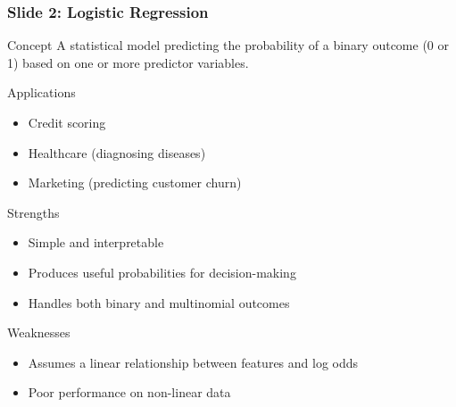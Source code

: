 \documentclass[aspectratio=169]{beamer}
\begin{document}
\begin{frame}[fragile]
    \frametitle{Slide 2: Logistic Regression}
    \begin{block}{Concept}
        A statistical model predicting the probability of a binary outcome (0 or 1) based on one or more predictor variables.
    \end{block}
    \begin{block}{Applications}
        \begin{itemize}
            \item Credit scoring
            \item Healthcare (diagnosing diseases)
            \item Marketing (predicting customer churn)
        \end{itemize}
    \end{block}
    \begin{block}{Strengths}
        \begin{itemize}
            \item Simple and interpretable
            \item Produces useful probabilities for decision-making
            \item Handles both binary and multinomial outcomes
        \end{itemize}
    \end{block}
    \begin{block}{Weaknesses}
        \begin{itemize}
            \item Assumes a linear relationship between features and log odds
            \item Poor performance on non-linear data
        \end{itemize}
    \end{block}
\end{frame}
\end{document}
